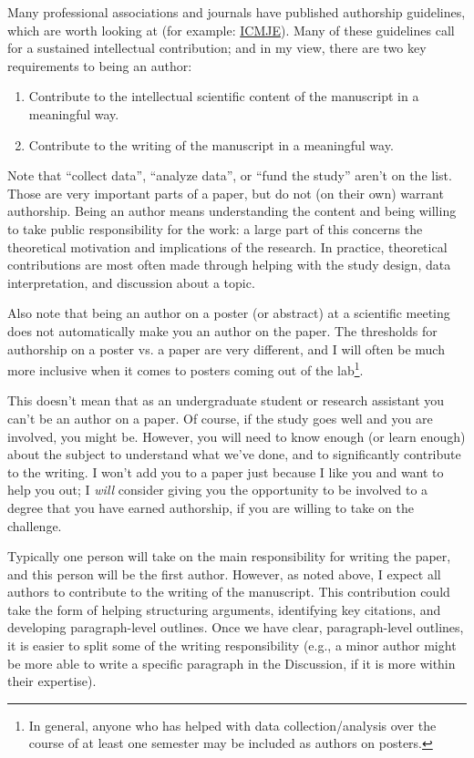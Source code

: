 \documentclass[letterpaper,11pt,oneside]{memoir}
\begin{document}
Many professional associations and journals have published authorship guidelines, which are worth looking at (for example: \href{http://www.icmje.org/recommendations/browse/roles-and-responsibilities/defining-the-role-of-authors-and-contributors.html}{ICMJE}). Many of these guidelines call for a sustained intellectual contribution; and in my view, there are two key requirements to being an author:

\begin{enumerate}
\item Contribute to the intellectual scientific content of the manuscript in a meaningful way.
\item Contribute to the writing of the manuscript in a meaningful way.
\end{enumerate}

Note that ``collect data'', ``analyze data'', or ``fund the study'' aren't on the list. Those are very important parts of a paper, but do not (on their own) warrant authorship. Being an author means understanding the content and being willing to take public responsibility for the work: a large part of this concerns the theoretical motivation and implications of the research. In practice, theoretical contributions are most often made through helping with the study design, data interpretation, and discussion about a topic.

Also note that being an author on a poster (or abstract) at a scientific meeting does not automatically make you an author on the paper. The thresholds for authorship on a poster vs. a paper are very different, and I will often be much more inclusive when it comes to posters coming out of the lab\footnote{In general, anyone who has helped with data collection/analysis over the course of at least one semester may be included as authors on posters.}.

This doesn't mean that as an undergraduate student or research assistant you can't be an author on a paper. Of course, if the study goes well and you are involved, you might be. However, you will need to know enough (or learn enough) about the subject to understand what we've done, and to significantly contribute to the writing. I won't add you to a paper just because I like you and want to help you out; I {\itshape will} consider giving you the opportunity to be involved to a degree that you have earned authorship, if you are willing to take on the challenge.

Typically one person will take on the main responsibility for writing the paper, and this person will be the first author. However, as noted above, I expect all authors to contribute to the writing of the manuscript. This contribution could take the form of helping structuring arguments, identifying key citations, and developing paragraph-level outlines. Once we have clear, paragraph-level outlines, it is easier to split some of the writing responsibility (e.g., a minor author might be more able to write a specific paragraph in the Discussion, if it is more within their expertise).
\end{document}
